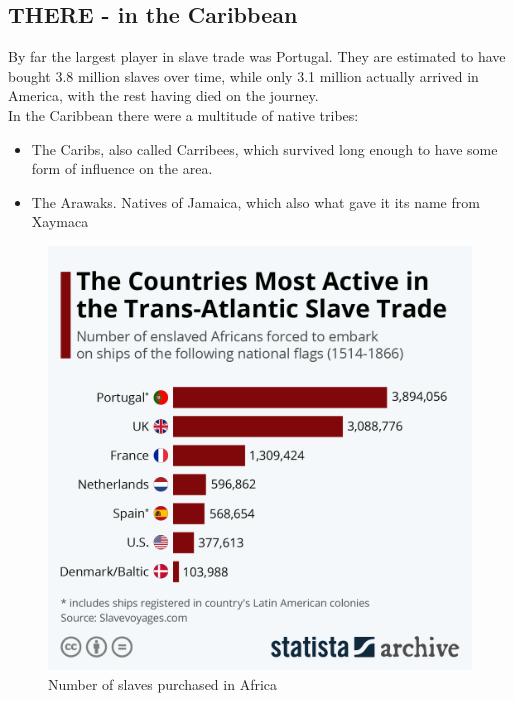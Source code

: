 \documentclass{article}
\begin{document}
	\subsection{THERE - in the Caribbean}
	By far the largest player in slave trade was Portugal. They are estimated to have bought 3.8 million slaves over time, while only 3.1 million actually arrived in America, with the rest having died on the journey. \\
	In the Caribbean there were a multitude of native tribes:
	\begin{itemize}
		\item{The Caribs, also called Carribees, which survived long enough to have some form of influence on the area.}
		\item{The Arawaks. Natives of Jamaica, which also what gave it its name from Xaymaca}
	\end{itemize}
	\begin{figure}
	\includegraphics[scale=0.2]{Images/Slave_Trade.jpeg}
	\caption{Number of slaves purchased in Africa}
	\end{figure}
\end{document}
